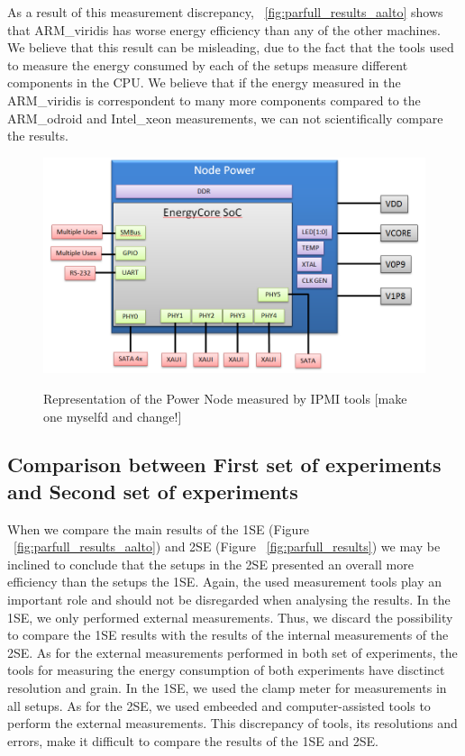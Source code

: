 As a result of this measurement discrepancy, ~\ref{fig:parfull_results_aalto} shows that ARM\_viridis has worse energy efficiency than any of the other machines. We believe that this result can be misleading, due to the fact that the tools used to measure the energy consumed by each of the setups measure different components in the CPU. We believe that if the energy measured in the ARM\_viridis is correspondent to many more components compared to the ARM\_odroid and Intel\_xeon measurements, we can not scientifically compare the results.

\begin{figure}[h!]
  \centering
    \includegraphics[width=150mm]{"img/aalto/power_node_ipmitool"}
    \label{fig:power_node_ipmitool}
    \caption{Representation of the Power Node measured by IPMI tools [make one myselfd and change!]}
\end{figure}


\subsection*{Comparison between First set of experiments and Second set of experiments}

When we compare the main results of the 1SE (Figure ~\ref{fig:parfull_results_aalto}) and 2SE (Figure ~\ref{fig:parfull_results}) we may be inclined to conclude that the setups in the 2SE presented an overall more efficiency than the setups the 1SE. Again, the used measurement tools play an important role and should not be disregarded when analysing the results. 
In the 1SE, we only performed external measurements. Thus, we discard the possibility to compare the 1SE results with the results of the internal measurements of the 2SE. 
As for the external measurements performed in both set of experiments, the tools for measuring the energy consumption of both experiments have disctinct resolution and grain. In the 1SE, we used the clamp meter for measurements in all setups. As for the 2SE, we used embeeded and computer-assisted tools to perform the external measurements. This discrepancy of tools, its resolutions and errors, make it difficult to compare the results of the 1SE and 2SE.

